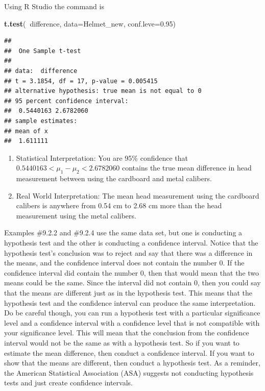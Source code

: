 \documentclass[
]{book}
\newenvironment{Shaded}{\begin{snugshade}}{\end{snugshade}}
\newcommand{\DataTypeTok}[1]{\textcolor[rgb]{0.13,0.29,0.53}{#1}}
\newcommand{\FloatTok}[1]{\textcolor[rgb]{0.00,0.00,0.81}{#1}}
\newcommand{\KeywordTok}[1]{\textcolor[rgb]{0.13,0.29,0.53}{\textbf{#1}}}
\newcommand{\NormalTok}[1]{#1}
\newcommand{\OperatorTok}[1]{\textcolor[rgb]{0.81,0.36,0.00}{\textbf{#1}}}
\begin{document}
Using R Studio the command is

\begin{Shaded}
\begin{Highlighting}[]
\KeywordTok{t.test}\NormalTok{(}\OperatorTok{~}\NormalTok{difference, }\DataTypeTok{data=}\NormalTok{Helmet_new, }\DataTypeTok{conf.leve=}\FloatTok{0.95}\NormalTok{)}
\end{Highlighting}
\end{Shaded}

\begin{verbatim}
## 
##  One Sample t-test
## 
## data:  difference
## t = 3.1854, df = 17, p-value = 0.005415
## alternative hypothesis: true mean is not equal to 0
## 95 percent confidence interval:
##  0.5440163 2.6782060
## sample estimates:
## mean of x 
##  1.611111
\end{verbatim}

\begin{enumerate}
\def\labelenumi{\arabic{enumi}.}
\setcounter{enumi}{3}
\item
  Statistical Interpretation: You are 95\% confidence that \(0.5440163<\mu_1-\mu_2<2.6782060\) contains the true mean difference in head measurement between using the cardboard and metal calibers.
\item
  Real World Interpretation: The mean head measurement using the cardboard calibers is anywhere from 0.54 cm to 2.68 cm more than the head measurement using the metal calibers.
\end{enumerate}

Examples \#9.2.2 and \#9.2.4 use the same data set, but one is conducting a hypothesis test and the other is conducting a confidence interval. Notice that the hypothesis test's conclusion was to reject and say that there was a difference in the means, and the confidence interval does not contain the number 0. If the confidence interval did contain the number 0, then that would mean that the two means could be the same. Since the interval did not contain 0, then you could say that the means are different just as in the hypothesis test. This means that the hypothesis test and the confidence interval can produce the same interpretation. Do be careful though, you can run a hypothesis test with a particular significance level and a confidence interval with a confidence level that is not compatible with your significance level. This will mean that the conclusion from the confidence interval would not be the same as with a hypothesis test. So if you want to estimate the mean difference, then conduct a confidence interval. If you want to show that the means are different, then conduct a hypothesis test. As a reminder, the American Statistical Association (ASA) suggests not conducting hypothesis tests and just create confidence intervals.
\end{document}
